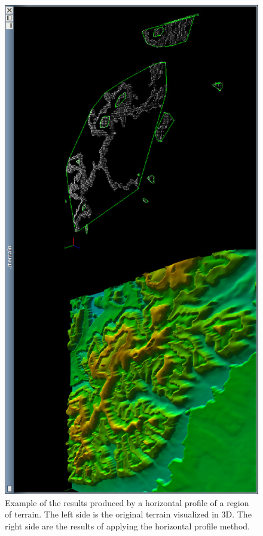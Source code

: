\begin{figure}[ht]
\centering
  \includegraphics[angle=270,width=\linewidth]{images/network_vis/terrain_horizontal_cut.eps}
  \caption{Example of the results produced by a horizontal profile of a region of terrain.  The left side is the original terrain visualized in 3D.  The right side are the results of applying the horizontal profile method.}
\label{fig:terrain_horizontal_cut}
\end{figure}

